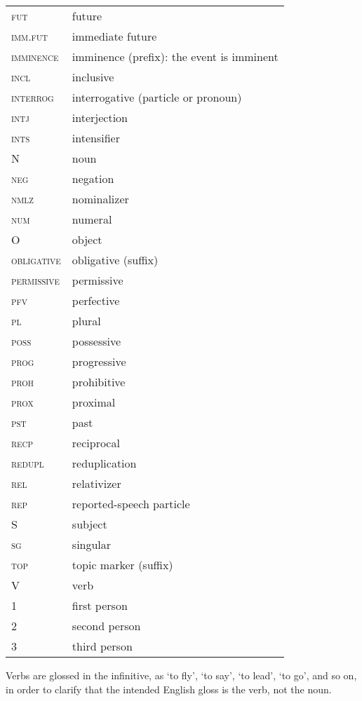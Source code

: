 \begin{refsection}
\begin{table}[H]
\begin{tabularx}{\textwidth}{ @{}l Q }
	\textsc{fut} & future\\
	\textsc{imm.fut} & immediate future\\
	\textsc{imminence} & imminence (prefix): the event is imminent\\
	\textsc{incl} & inclusive\\
	\textsc{interrog} & interrogative (particle or pronoun)\\
	\textsc{intj} & interjection\\
	\textsc{ints} & intensifier\\
	\textsc{N} & noun\\
	\textsc{neg} & negation\\
	\textsc{nmlz} & nominalizer\\
	\textsc{num} & numeral\\
	\textsc{O} & object\\
	\textsc{obligative} & obligative (suffix)\\
	\textsc{permissive} & permissive\\
	\textsc{pfv} & perfective\\
	\textsc{pl} & plural\\
	\textsc{poss} & possessive\\
	\textsc{prog} & progressive\\
	\textsc{proh} & prohibitive\\
	\textsc{prox} & proximal\\
	\textsc{pst} & past\\
	\textsc{recp} & reciprocal\\
	\textsc{redupl} & reduplication\\
	\textsc{rel} & relativizer\\
	\textsc{rep} & reported-speech particle\\
	\textsc{S} & subject\\
	\textsc{sg} & singular\\
	\textsc{top} & topic marker (suffix)\\
	\textsc{V} & verb\\
	1 & first person\\
	2 & second person\\
	3 & third person\\
\end{tabularx}
\end{table}

Verbs are glossed in the infinitive, as ‘to fly’, ‘to say’, ‘to lead’, ‘to go’, and so on, in order to clarify that the intended English gloss is the verb, not the noun. 


\end{refsection}
